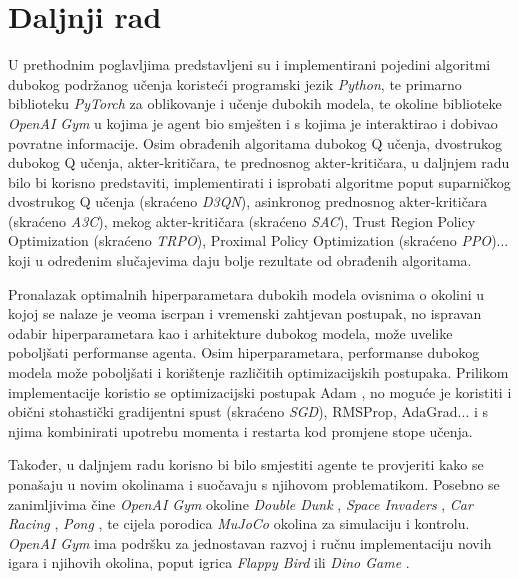 \chapter{Daljnji rad}

U prethodnim poglavljima predstavljeni su i implementirani pojedini algoritmi dubokog podržanog učenja koristeći programski jezik \textit{Python}, te primarno biblioteku \textit{PyTorch} za oblikovanje i učenje dubokih modela, te okoline biblioteke \textit{OpenAI Gym} u kojima je agent bio smješten i s kojima je interaktirao i dobivao povratne informacije. Osim obrađenih algoritama dubokog Q učenja, dvostrukog dubokog Q učenja, akter-kritičara, te prednosnog akter-kritičara, u daljnjem radu bilo bi korisno predstaviti, implementirati i isprobati algoritme poput suparničkog dvostrukog Q učenja  (skraćeno \textit{D3QN}), asinkronog prednosnog akter-kritičara  (skraćeno \textit{A3C}), mekog akter-kritičara  (skraćeno \textit{SAC}), Trust Region Policy Optimization (skraćeno \textit{TRPO}), Proximal Policy Optimization (skraćeno \textit{PPO})... koji u određenim slučajevima daju bolje rezultate od obrađenih algoritama.

Pronalazak optimalnih hiperparametara dubokih modela ovisnima o okolini u kojoj se nalaze je veoma iscrpan i vremenski zahtjevan postupak, no ispravan odabir hiperparametara kao i arhitekture dubokog modela, može uvelike poboljšati performanse agenta. Osim hiperparametara, performanse dubokog modela može poboljšati i korištenje različitih optimizacijskih postupaka. Prilikom implementacije koristio se optimizacijski postupak Adam , no moguće je koristiti i obični stohastički gradijentni spust  (skraćeno \textit{SGD}), RMSProp, AdaGrad... i s njima kombinirati upotrebu momenta i restarta kod promjene stope učenja. 

Također, u daljnjem radu korisno bi bilo smjestiti agente te provjeriti kako se ponašaju u novim okolinama i suočavaju s njihovom problematikom. Posebno se zanimljivima čine \textit{OpenAI Gym} okoline \textit{Double Dunk} \cite{DoubleDunk}, \textit{Space Invaders} \cite{SpaceInvaders}, \textit{Car Racing} \cite{CarRacing}, \textit{Pong} \cite{Pong}, te cijela porodica \textit{MuJoCo} okolina za simulaciju i kontrolu. \textit{OpenAI Gym} ima podršku za jednostavan razvoj i ručnu implementaciju novih igara i njihovih okolina, poput igrica \textit{Flappy Bird} \cite{CustomFlappyBird} ili \textit{Dino Game} \cite{CustomDinoGame}.


